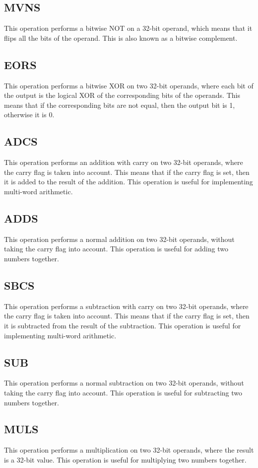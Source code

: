 \documentclass[9pt,a4paper,twoside]{tau}
\begin{document}
        \subsection{MVNS}
        This operation performs a bitwise NOT on a 32-bit operand, which means that it flips all the bits of the operand. This is also known as a bitwise complement. 
        \subsection{EORS}
        This operation performs a bitwise XOR on two 32-bit operands, where each bit of the output is the logical XOR of the corresponding bits of the operands. This means that if the corresponding bits are not equal, then the output bit is 1, otherwise it is 0. 
        \subsection{ADCS}
        This operation performs an addition with carry on two 32-bit operands, where the carry flag is taken into account. This means that if the carry flag is set, then it is added to the result of the addition. This operation is useful for implementing multi-word arithmetic. 
        \subsection{ADDS}
        This operation performs a normal addition on two 32-bit operands, without taking the carry flag into account. This operation is useful for adding two numbers together. 
        \subsection{SBCS}
        This operation performs a subtraction with carry on two 32-bit operands, where the carry flag is taken into account. This means that if the carry flag is set, then it is subtracted from the result of the subtraction. This operation is useful for implementing multi-word arithmetic. 
        \subsection{SUB}
        This operation performs a normal subtraction on two 32-bit operands, without taking the carry flag into account. This operation is useful for subtracting two numbers together. 
        \subsection{MULS}
        This operation performs a multiplication on two 32-bit operands, where the result is a 32-bit value. This operation is useful for multiplying two numbers together. 
\end{document}
